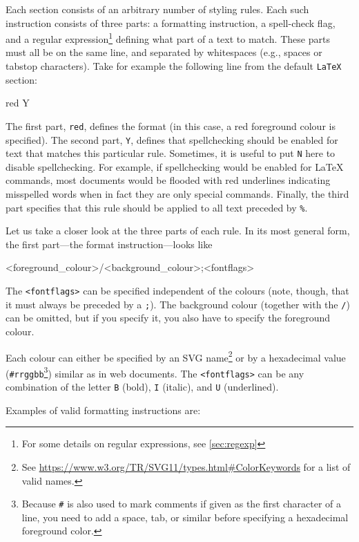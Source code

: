 Each section consists of an arbitrary number of styling rules. Each such instruction consists of three parts: a formatting instruction, a spell-check flag, and a regular expression\footnote{For some details on regular expressions, see \ref{sec:regexp}} defining what part of a text to match. These parts must all be on the same line, and separated by whitespaces (e.g., spaces or tabstop characters). Take for example the following line from the default \verb|LaTeX| section:
\begin{verbExample}
red    Y    %
\end{verbExample}
The first part, \verb|red|, defines the format (in this case, a red foreground colour is specified). The second part, \verb|Y|, defines that spellchecking should be enabled for text that matches this particular rule. Sometimes, it is useful to put \verb|N| here to disable spellchecking. For example, if spellchecking would be enabled for {\LaTeX} commands, most documents would be flooded with red underlines indicating misspelled words when in fact they are only special commands. Finally, the third part specifies that this rule should be applied to all text preceded by \verb|%|.

Let us take a closer look at the three parts of each rule. In its most general form, the first part---the format instruction---looks like 
\begin{verbExample}
<foreground_colour>/<background_colour>;<fontflags>
\end{verbExample}
The \verb|<fontflags>| can be specified independent of the colours (note, though, that it must always be preceded by a \verb|;|). The background colour (together with the \verb|/|) can be omitted, but if you specify it, you also have to specify the foreground colour.

Each colour can either be specified by an SVG name\footnote{See \url{https://www.w3.org/TR/SVG11/types.html#ColorKeywords} for a list of valid names.} or by a hexadecimal value (\verb|#rrggbb|\footnote{Because \verb|#| is also used to mark comments if given as the first character of a line, you need to add a space, tab, or similar before specifying a hexadecimal foreground color.}) similar as in web documents. The \verb|<fontflags>| can be any combination of the letter \verb|B| (bold), \verb|I| (italic), and \verb|U| (underlined).

Examples of valid formatting instructions are:

